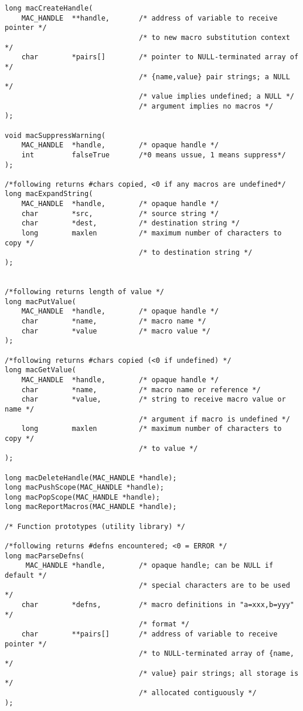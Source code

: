 \begin{verbatim}
long macCreateHandle(
    MAC_HANDLE  **handle,       /* address of variable to receive pointer */
                                /* to new macro substitution context */
    char        *pairs[]        /* pointer to NULL-terminated array of */
                                /* {name,value} pair strings; a NULL */
                                /* value implies undefined; a NULL */
                                /* argument implies no macros */
);

void macSuppressWarning(
    MAC_HANDLE  *handle,        /* opaque handle */
    int         falseTrue       /*0 means ussue, 1 means suppress*/
);

/*following returns #chars copied, <0 if any macros are undefined*/
long macExpandString(
    MAC_HANDLE  *handle,        /* opaque handle */
    char        *src,           /* source string */
    char        *dest,          /* destination string */
    long        maxlen          /* maximum number of characters to copy */
                                /* to destination string */
);


/*following returns length of value */
long macPutValue(
    MAC_HANDLE  *handle,        /* opaque handle */
    char        *name,          /* macro name */
    char        *value          /* macro value */
);

/*following returns #chars copied (<0 if undefined) */
long macGetValue(
    MAC_HANDLE  *handle,        /* opaque handle */
    char        *name,          /* macro name or reference */
    char        *value,         /* string to receive macro value or name */
                                /* argument if macro is undefined */
    long        maxlen          /* maximum number of characters to copy */
                                /* to value */
);

long macDeleteHandle(MAC_HANDLE *handle);
long macPushScope(MAC_HANDLE *handle);
long macPopScope(MAC_HANDLE *handle);
long macReportMacros(MAC_HANDLE *handle);

/* Function prototypes (utility library) */

/*following returns #defns encountered; <0 = ERROR */
long macParseDefns(
     MAC_HANDLE *handle,        /* opaque handle; can be NULL if default */
                                /* special characters are to be used */
    char        *defns,         /* macro definitions in "a=xxx,b=yyy" */
                                /* format */
    char        **pairs[]       /* address of variable to receive pointer */
                                /* to NULL-terminated array of {name, */
                                /* value} pair strings; all storage is */
                                /* allocated contiguously */
);


\end{verbatim}
